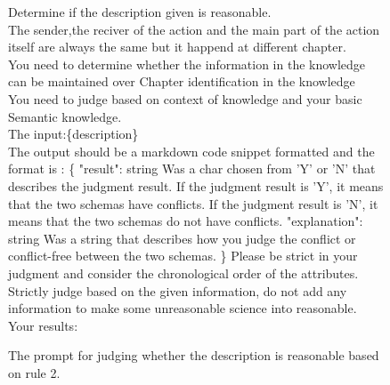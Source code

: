 \begin{figure}[htbp]
\centering
\begin{tcolorbox}
Determine if the description given is reasonable.
\\
The sender,the reciver of the action and the main part of the action itself are always the same but it happend at different chapter.\\
You need to determine whether the information in the knowledge can be maintained over Chapter identification in the knowledge\\
You need to judge based on context of knowledge and your basic Semantic knowledge.\\
The input:\{description\}\\
The output should be a markdown code snippet formatted and the format is : 
\{
        "result": string  Was a char chosen from 'Y' or 'N' that describes the judgment result. If the judgment result is 'Y', it means that the two schemas have conflicts. If the judgment result is 'N', it means that the two schemas do not have conflicts.
        "explanation": string Was a string that describes how you judge the conflict or conflict-free between the two schemas.
\}
Please be strict in your judgment and consider the chronological order of the attributes.\\
Strictly judge based on the given information, do not add any information to make some unreasonable science into reasonable.\\
Your results:\\
\end{tcolorbox}
\caption{The prompt for judging whether the description is reasonable based on rule 2.}
\label{tab:judge2}
\end{figure}


